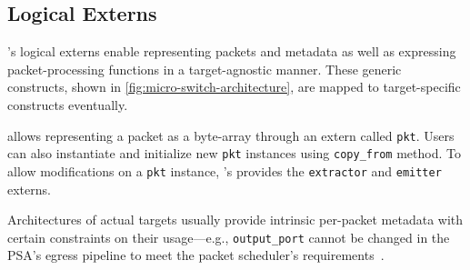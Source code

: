 \documentclass[letterpaper,twocolumn,10pt]{article}
\begin{document}
\subsection{Logical Externs}
\label{sec:logical-externs}
\uarch's logical externs  enable representing packets and metadata as
well as expressing packet-processing functions in a target-agnostic
manner. These generic constructs, shown in
\cref{fig:micro-switch-architecture}, are mapped to target-specific
constructs eventually.

\uarch allows representing a packet as a byte-array through an extern
called \texttt{pkt}. Users can also instantiate and initialize new
\texttt{pkt} instances using \texttt{copy\_from} method.  To allow
modifications on a \texttt{pkt} instance, \uarch's provides the
\texttt{extractor} and \texttt{emitter} externs.



Architectures of actual targets usually provide intrinsic per-packet
metadata with certain constraints on their usage---e.g.,
\texttt{output\_port} cannot be changed in the PSA's egress pipeline
to meet the packet scheduler's requirements~\cite{psa}.
\end{document}
